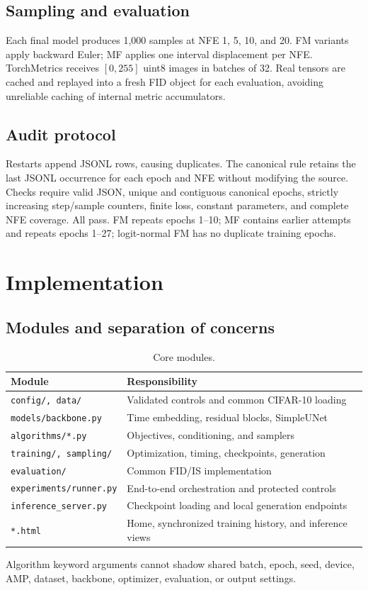 \documentclass{iutbscthesis}
\begin{document}
\section{Sampling and evaluation}
Each final model produces 1,000 samples at NFE 1, 5, 10, and 20. FM variants apply backward Euler; MF applies one interval displacement per NFE. TorchMetrics receives $[0,255]$ uint8 images in batches of 32. Real tensors are cached and replayed into a fresh FID object for each evaluation, avoiding unreliable caching of internal metric accumulators.
\section{Audit protocol}\label{sec:audit}
Restarts append JSONL rows, causing duplicates. The canonical rule retains the last JSONL occurrence for each epoch and NFE without modifying the source. Checks require valid JSON, unique and contiguous canonical epochs, strictly increasing step/sample counters, finite loss, constant parameters, and complete NFE coverage. All pass. FM repeats epochs 1--10; MF contains earlier attempts and repeats epochs 1--27; logit-normal FM has no duplicate training epochs.

\chapter{Implementation}
\section{Modules and separation of concerns}
\begin{table}[htbp]\centering\caption{Core modules.}\begin{tabularx}{\textwidth}{p{}X}\toprule
Module&Responsibility\\\midrule
\texttt{config/, data/}&Validated controls and common CIFAR-10 loading\\
\texttt{models/backbone.py}&Time embedding, residual blocks, SimpleUNet\\
\texttt{algorithms/*.py}&Objectives, conditioning, and samplers\\
\texttt{training/, sampling/}&Optimization, timing, checkpoints, generation\\
\texttt{evaluation/}&Common FID/IS implementation\\
\texttt{experiments/runner.py}&End-to-end orchestration and protected controls\\
\texttt{inference\_server.py}&Checkpoint loading and local generation endpoints\\
\texttt{*.html}&Home, synchronized training history, and inference views\\\bottomrule\end{tabularx}\end{table}
Algorithm keyword arguments cannot shadow shared batch, epoch, seed, device, AMP, dataset, backbone, optimizer, evaluation, or output settings.
\end{document}
